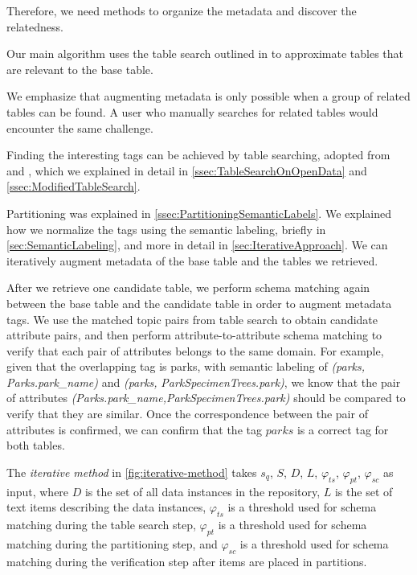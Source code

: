 Therefore, we need methods to organize the metadata and discover the relatedness.

Our main algorithm uses the table search outlined in \cite{Mudgal2018Deep} to approximate tables that are relevant to the base table.

We emphasize that augmenting metadata is only possible when a group of related tables can be found. A user who manually searches for related tables would encounter the same challenge.

Finding the interesting tags can be achieved by table searching, adopted from \cite{Nargesian2018Table} and \cite{conf/esws/EllefiBDT16}, which we explained in detail in \autoref{ssec:TableSearchOnOpenData} and \autoref{ssec:ModifiedTableSearch}.

Partitioning was explained in \autoref{ssec:PartitioningSemanticLabels}. We explained how we normalize the tags using the semantic labeling, briefly in \autoref{sec:SemanticLabeling}, and more in detail in \autoref{sec:IterativeApproach}. We can iteratively augment metadata of the base table and the tables we retrieved.

After we retrieve one candidate table, we perform schema matching again between the base table and the candidate table in order to augment metadata tags. We use the matched topic pairs from table search to obtain candidate attribute pairs, and then perform attribute-to-attribute schema matching to verify that each pair of attributes belongs to the same domain. For example, given that the overlapping tag is parks, with semantic labeling of \textit{(parks, Parks.park\_name)} and \textit{(parks}\textit{, }\textit{Park\-Specimen\-Trees.park)}, we know that the pair of attributes \textit{(Parks.park\_name}\textit{,}\textit{Park\-Specimen\-Trees.park)} should be compared to verify that they are similar. Once the correspondence between the pair of attributes is confirmed, we can confirm that the tag $parks$ is a correct tag for both tables.

The \textit{iterative method} in \autoref{fig:iterative-method} takes $s_q$, $S$, $D$, $L$, $\ensuremath{\varphi}_{ts}$, $\ensuremath{\varphi}_{pt}$, $\ensuremath{\varphi}_{sc}$ as input, where $D$ is the set of all data instances in the repository, $L$ is the set of text items describing the data instances, $\ensuremath{\varphi}_{ts}$ is a threshold used for schema matching during the table search step, $\ensuremath{\varphi}_{pt}$ is a threshold used for schema matching during the partitioning step, and $\ensuremath{\varphi}_{sc}$ is a threshold used for schema matching during the verification step after items are placed in partitions.

